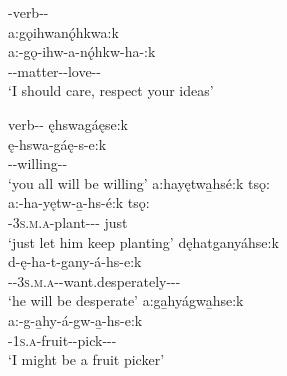 \ea\label{ex:habitvarex6}  \exsc{\indefinite}-verb-{\habitual}-{\modalizer}\\
a:gǫihwanǫ́hkwa:k \\
\gll a:-gǫ-ihw-a-nǫ́hkw-ha-:k\\
 {\indefinite}--matter-{\joinerA}-love-{\habitual}-{\modalizer}\\
\glt `I should care, respect your ideas'
\z


\ea\label{ex:habitvarex5}  \exsc{\future/\indefinite-}verb-{\habitual}-{\modalizer}
\ea\label{ex:habitvarex5a} ęhswagáęse:k\\
\gll ę-hswa-gáę-s-e:k\\
 \fut--willing-{\habitual}-{\modalizer}\\
\glt `you all will be willing'
\ex a:hayętwa̱hsé:k tsǫ:\\
\gll a:-ha-yętw-a̱-hs-é:k tsǫ:\\
 {\indefinite}-\textsc{3s.m.a}-plant-{\joinerA}-{\habitual}-{\modalizer} just\\
\glt `just let him keep planting'
\ex dęhatganyáhse:k\\
\gll d-ę-ha-t-gany-á-hs-e:k\\
 {\dualic}-{\future}-\textsc{3s.m.a}-{\semireflexive}-want.desperately-{\joinerA}-{\habitual}-{\modalizer}\\
\glt `he will be desperate'
\ex\label{ex:habitvarex5d} a:ga̱hyágwa̱hse:k\\
\gll a:-g-a̱hy-á-gw-a̱-hs-e:k\\
 {\indefinite}-\textsc{1s.a}-fruit-{\joinerA}-pick-{\joinerA}-{\habitual}-{\modalizer}\\
\glt `I might be a fruit picker'
\z
\z


